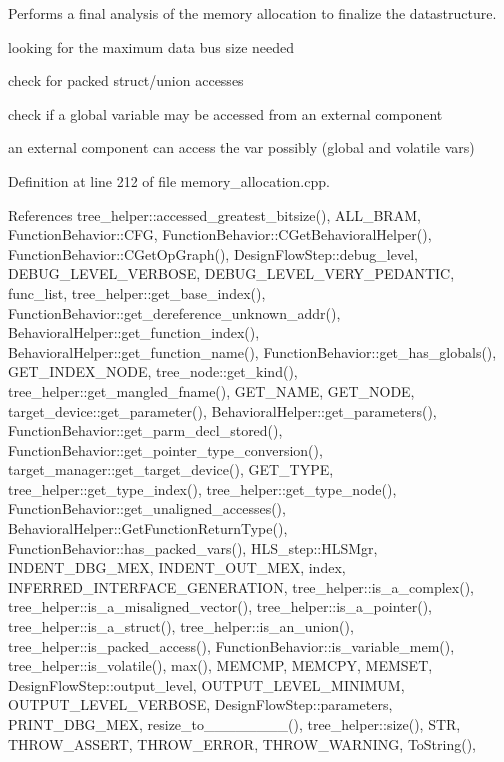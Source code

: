 Performs a final analysis of the memory allocation to finalize the datastructure. 

looking for the maximum data bus size needed

check for packed struct/union accesses

check if a global variable may be accessed from an external component

an external component can access the var possibly (global and volatile vars) 

Definition at line 212 of file memory\+\_\+allocation.\+cpp.



References tree\+\_\+helper\+::accessed\+\_\+greatest\+\_\+bitsize(), A\+L\+L\+\_\+\+B\+R\+AM, Function\+Behavior\+::\+C\+FG, Function\+Behavior\+::\+C\+Get\+Behavioral\+Helper(), Function\+Behavior\+::\+C\+Get\+Op\+Graph(), Design\+Flow\+Step\+::debug\+\_\+level, D\+E\+B\+U\+G\+\_\+\+L\+E\+V\+E\+L\+\_\+\+V\+E\+R\+B\+O\+SE, D\+E\+B\+U\+G\+\_\+\+L\+E\+V\+E\+L\+\_\+\+V\+E\+R\+Y\+\_\+\+P\+E\+D\+A\+N\+T\+IC, func\+\_\+list, tree\+\_\+helper\+::get\+\_\+base\+\_\+index(), Function\+Behavior\+::get\+\_\+dereference\+\_\+unknown\+\_\+addr(), Behavioral\+Helper\+::get\+\_\+function\+\_\+index(), Behavioral\+Helper\+::get\+\_\+function\+\_\+name(), Function\+Behavior\+::get\+\_\+has\+\_\+globals(), G\+E\+T\+\_\+\+I\+N\+D\+E\+X\+\_\+\+N\+O\+DE, tree\+\_\+node\+::get\+\_\+kind(), tree\+\_\+helper\+::get\+\_\+mangled\+\_\+fname(), G\+E\+T\+\_\+\+N\+A\+ME, G\+E\+T\+\_\+\+N\+O\+DE, target\+\_\+device\+::get\+\_\+parameter(), Behavioral\+Helper\+::get\+\_\+parameters(), Function\+Behavior\+::get\+\_\+parm\+\_\+decl\+\_\+stored(), Function\+Behavior\+::get\+\_\+pointer\+\_\+type\+\_\+conversion(), target\+\_\+manager\+::get\+\_\+target\+\_\+device(), G\+E\+T\+\_\+\+T\+Y\+PE, tree\+\_\+helper\+::get\+\_\+type\+\_\+index(), tree\+\_\+helper\+::get\+\_\+type\+\_\+node(), Function\+Behavior\+::get\+\_\+unaligned\+\_\+accesses(), Behavioral\+Helper\+::\+Get\+Function\+Return\+Type(), Function\+Behavior\+::has\+\_\+packed\+\_\+vars(), H\+L\+S\+\_\+step\+::\+H\+L\+S\+Mgr, I\+N\+D\+E\+N\+T\+\_\+\+D\+B\+G\+\_\+\+M\+EX, I\+N\+D\+E\+N\+T\+\_\+\+O\+U\+T\+\_\+\+M\+EX, index, I\+N\+F\+E\+R\+R\+E\+D\+\_\+\+I\+N\+T\+E\+R\+F\+A\+C\+E\+\_\+\+G\+E\+N\+E\+R\+A\+T\+I\+ON, tree\+\_\+helper\+::is\+\_\+a\+\_\+complex(), tree\+\_\+helper\+::is\+\_\+a\+\_\+misaligned\+\_\+vector(), tree\+\_\+helper\+::is\+\_\+a\+\_\+pointer(), tree\+\_\+helper\+::is\+\_\+a\+\_\+struct(), tree\+\_\+helper\+::is\+\_\+an\+\_\+union(), tree\+\_\+helper\+::is\+\_\+packed\+\_\+access(), Function\+Behavior\+::is\+\_\+variable\+\_\+mem(), tree\+\_\+helper\+::is\+\_\+volatile(), max(), M\+E\+M\+C\+MP, M\+E\+M\+C\+PY, M\+E\+M\+S\+ET, Design\+Flow\+Step\+::output\+\_\+level, O\+U\+T\+P\+U\+T\+\_\+\+L\+E\+V\+E\+L\+\_\+\+M\+I\+N\+I\+M\+UM, O\+U\+T\+P\+U\+T\+\_\+\+L\+E\+V\+E\+L\+\_\+\+V\+E\+R\+B\+O\+SE, Design\+Flow\+Step\+::parameters, P\+R\+I\+N\+T\+\_\+\+D\+B\+G\+\_\+\+M\+EX, resize\+\_\+to\+\_\+\_\+\_\+\_\+\_\+\_\+\_\+\_(), tree\+\_\+helper\+::size(), S\+TR, T\+H\+R\+O\+W\+\_\+\+A\+S\+S\+E\+RT, T\+H\+R\+O\+W\+\_\+\+E\+R\+R\+OR, T\+H\+R\+O\+W\+\_\+\+W\+A\+R\+N\+I\+NG, To\+String(), 